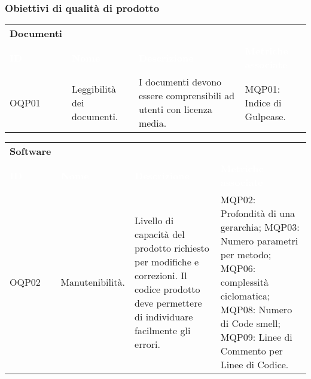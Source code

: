 \subsubsection{Obiettivi di qualità di prodotto}

\begin{table}[H]

    \renewcommand{\arraystretch}{1.5}
    \begin{tabular}{ m{}<{\centering}  m{}<{\centering}  m{}<{\centering}  m{}<{\centering} }
    	\rowcolor{gray!00} {\large{\textbf{Documenti}}}\\ 
        \rowcolor{darkblue}
        \textcolor{white}{\textbf{ID}} &\textcolor{white}{\textbf{Nome}}& \textcolor{white}{\textbf{Descrizione}} & \textcolor{white}{\textbf{Metriche associate}}\\ 

		\rowcolor{gray!00}
        OQP01 &
        Leggibilità dei documenti. &
        I documenti devono essere comprensibili ad utenti con licenza media. &
        MQP01: Indice di Gulpease. \\        
\end{tabular}


    \renewcommand{\arraystretch}{1.5}
    \begin{tabular}{ m{}<{\centering}  m{}<{\centering}  m{}<{\centering}  m{}<{\centering} }
        \rowcolor{gray!00} {\large{\textbf{Software}}}\\ 
        \rowcolor{darkblue}
        \textcolor{white}{\textbf{ID}} &\textcolor{white}{\textbf{Nome}}& \textcolor{white}{\textbf{Descrizione}} & \textcolor{white}{\textbf{Metriche associate}}\\ 

		\rowcolor{gray!00}
        OQP02 &
        Manutenibilità. &
        Livello di capacità del prodotto richiesto per modifiche e correzioni. Il codice prodotto deve permettere di individuare facilmente gli errori. &
        MQP02: Profondità di una gerarchia; \newline
        MQP03: Numero parametri per metodo; \newline
        MQP06: complessità ciclomatica; \newline
        MQP08: Numero di Code smell; \newline
        MQP09: Linee di Commento per Linee di Codice. \\


\end{tabular}
\end{table}
